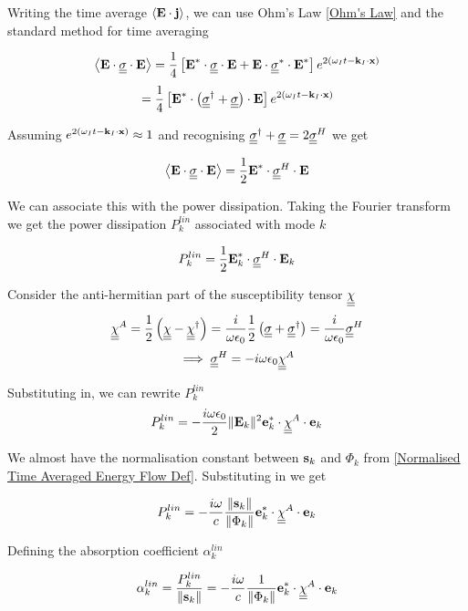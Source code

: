 Writing the time average $\left \langle \textbf{E} \cdot \textbf{j} \right \rangle$, we can use Ohm's Law \eqref{Ohm's Law} and the standard method for time averaging

\begin{equation*}
	\left \langle \textbf{E} \cdot \underline{\underline{\sigma}} \cdot \textbf{E} \right \rangle = \frac{1}{4} \left[ \textbf{E}^* \cdot \underline{\underline{\sigma}} \cdot \textbf{E} + \textbf{E} \cdot \underline{\underline{\sigma}}^* \cdot \textbf{E}^* \right] e^{2 \left( \omega_I t - \textbf{k}_I \cdot \textbf{x} \right)}
\end{equation*}
\begin{equation}
	= \frac{1}{4} \left[\textbf{E}^* \cdot \left( \underline{\underline{\sigma}}^{\dagger} + \underline{\underline{\sigma}} \right) \cdot \textbf{E} \right] e^{2 \left( \omega_I t - \textbf{k}_I \cdot \textbf{x} \right)}
\end{equation}

Assuming $e^{2 \left( \omega_I t - \textbf{k}_I \cdot \textbf{x} \right)} \approx 1$ and recognising $\underline{\underline{\sigma}}^{\dagger} + \underline{\underline{\sigma}} = 2 \underline{\underline{\sigma}}^H$ we get

\begin{equation}
	\left \langle \textbf{E} \cdot \underline{\underline{\sigma}} \cdot \textbf{E} \right \rangle = \frac{1}{2} \textbf{E}^* \cdot \underline{\underline{\sigma}}^H \cdot \textbf{E}
\end{equation}

We can associate this with the power dissipation. Taking the Fourier transform we get the power dissipation $P_k^{lin}$ associated with mode $k$

\begin{equation}
	P_k^{lin} = \frac{1}{2} \textbf{E}_k^* \cdot \underline{\underline{\sigma}}^H \cdot \textbf{E}_k
\end{equation}

Consider the anti-hermitian part of the susceptibility tensor $\underline{\underline{\chi}}$
\begin{equation*}
	\underline{\underline{\chi}}^A = \frac{1}{2} \left( \underline{\underline{\chi}} - \underline{\underline{\chi}}^{\dagger} \right) = \frac{i}{\omega \epsilon_0} \frac{1}{2} \left( \underline{\underline{\sigma}} + \underline{\underline{\sigma}}^{\dagger} \right) = \frac{i}{\omega \epsilon_0} \underline{\underline{\sigma}}^H
\end{equation*}
\begin{equation}
	\implies \underline{\underline{\sigma}}^H = -i \omega \epsilon_0 \underline{\underline{\chi}}^A
\end{equation}

Substituting in, we can rewrite $P_k^{lin}$
\begin{equation}
	P_k^{lin} = - \frac{i \omega \epsilon_0}{2} \|\textbf{E}_k\|^2 \textbf{e}_k^* \cdot \underline{\underline{\chi}}^A \cdot \textbf{e}_k
\end{equation}

We almost have the normalisation constant between $\textbf{s}_k$ and $\Phi_k$ from \eqref{Normalised Time Averaged Energy Flow Def}. Substituting in we get

\begin{equation}
	P_k^{lin} = - \frac{i \omega}{c} \frac{\|\textbf{s}_k\|}{\|\Phi_k\|} \textbf{e}_k^* \cdot \underline{\underline{\chi}}^A \cdot \textbf{e}_k
\end{equation}

Defining the absorption coefficient $\alpha_k^{lin}$

\begin{equation}
	\alpha_k^{lin} = \frac{P_k^{lin}}{\|\textbf{s}_k\|} = -\frac{i \omega}{c} \frac{1}{\|\Phi_k\|} \textbf{e}_k^* \cdot \underline{\underline{\chi}}^A \cdot \textbf{e}_k
\end{equation}